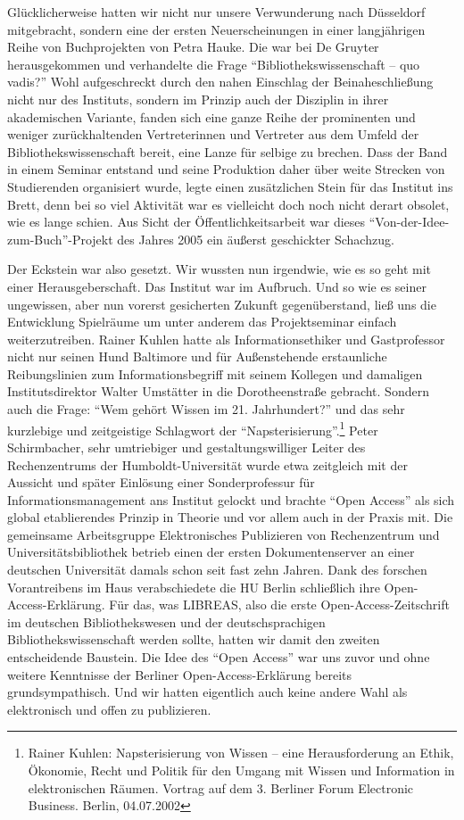 Glücklicherweise hatten wir nicht nur unsere Verwunderung nach
Düsseldorf mitgebracht, sondern eine der ersten Neuerscheinungen in
einer langjährigen Reihe von Buchprojekten von Petra Hauke. Die war bei
De Gruyter herausgekommen und verhandelte die Frage
\enquote{Bibliothekswissenschaft -- quo vadis?} Wohl aufgeschreckt durch
den nahen Einschlag der Beinaheschließung nicht nur des Instituts,
sondern im Prinzip auch der Disziplin in ihrer akademischen Variante,
fanden sich eine ganze Reihe der prominenten und weniger zurückhaltenden
Vertreterinnen und Vertreter aus dem Umfeld der Bibliothekswissenschaft
bereit, eine Lanze für selbige zu brechen. Dass der Band in einem
Seminar entstand und seine Produktion daher über weite Strecken von
Studierenden organisiert wurde, legte einen zusätzlichen Stein für das
Institut ins Brett, denn bei so viel Aktivität war es vielleicht doch
noch nicht derart obsolet, wie es lange schien. Aus Sicht der
Öffentlichkeitsarbeit war dieses \enquote{Von-der-Idee-zum-Buch}-Projekt
des Jahres 2005 ein äußerst geschickter Schachzug.

Der Eckstein war also gesetzt. Wir wussten nun irgendwie, wie es so geht
mit einer Herausgeberschaft. Das Institut war im Aufbruch. Und so wie es
seiner ungewissen, aber nun vorerst gesicherten Zukunft gegenüberstand,
ließ uns die Entwicklung Spielräume um unter anderem das Projektseminar
einfach weiterzutreiben. Rainer Kuhlen hatte als Informationsethiker und
Gastprofessor nicht nur seinen Hund Baltimore und für Außenstehende
erstaunliche Reibungslinien zum Informationsbegriff mit seinem Kollegen
und damaligen Institutsdirektor Walter Umstätter in die Dorotheenstraße
gebracht. Sondern auch die Frage: \enquote{Wem gehört Wissen im 21.
Jahrhundert?} und das sehr kurzlebige und zeitgeistige Schlagwort der
\enquote{Napsterisierung}.\footnote{Rainer Kuhlen: Napsterisierung von
  Wissen -- eine Herausforderung an Ethik, Ökonomie, Recht und Politik
  für den Umgang mit Wissen und Information in elektronischen Räumen.
  Vortrag auf dem 3. Berliner Forum Electronic Business. Berlin,
  04.07.2002} Peter Schirmbacher, sehr umtriebiger und
gestaltungswilliger Leiter des Rechenzentrums der Humboldt-Universität
wurde etwa zeitgleich mit der Aussicht und später Einlösung einer
Sonderprofessur für Informationsmanagement ans Institut gelockt und
brachte \enquote{Open Access} als sich global etablierendes Prinzip in
Theorie und vor allem auch in der Praxis mit. Die gemeinsame
Arbeitsgruppe Elektronisches Publizieren von Rechenzentrum und
Universitätsbibliothek betrieb einen der ersten Dokumentenserver an
einer deutschen Universität damals schon seit fast zehn Jahren. Dank des
forschen Vorantreibens im Haus verabschiedete die HU Berlin schließlich
ihre Open-Access-Erklärung. Für das, was LIBREAS, also die erste
Open-Access-Zeitschrift im deutschen Bibliothekswesen und der
deutschsprachigen Bibliothekswissenschaft werden sollte, hatten wir
damit den zweiten entscheidende Baustein. Die Idee des \enquote{Open
Access} war uns zuvor und ohne weitere Kenntnisse der Berliner
Open-Access-Erklärung bereits grundsympathisch. Und wir hatten
eigentlich auch keine andere Wahl als elektronisch und offen zu
publizieren.

